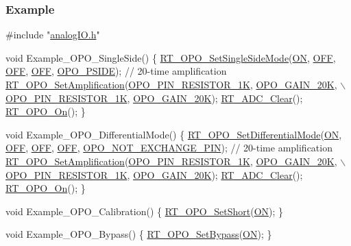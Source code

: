 \subsubsection*{Example}


\begin{DoxyCode}
\textcolor{preprocessor}{#include "\mbox{\hyperlink{a00005}{analogIO.h}}"}

\textcolor{keywordtype}{void} Example\_OPO\_SingleSide()
\{
    \mbox{\hyperlink{a00005_a6438defc0d6280f2b5baedc039f2e314}{RT\_OPO\_SetSingleSideMode}}(\mbox{\hyperlink{a00068_ad76d1750a6cdeebd506bfcd6752554d2}{ON}}, \mbox{\hyperlink{a00068_a29e413f6725b2ba32d165ffaa35b01e5}{OFF}}, \mbox{\hyperlink{a00068_a29e413f6725b2ba32d165ffaa35b01e5}{OFF}}, \mbox{\hyperlink{a00068_a29e413f6725b2ba32d165ffaa35b01e5}{OFF}}, 
      \mbox{\hyperlink{a00005_a8bcbcccda02f456b9d5395756791c1a4}{OPO\_PSIDE}});
    \textcolor{comment}{// 20-time amplification}
    \mbox{\hyperlink{a00005_ab2a6c21c91c7f05f3de9fefbd30ff95b}{RT\_OPO\_SetAmplification}}(\mbox{\hyperlink{a00005_a3e3450fbf20861f9c18264c410a6436d}{OPO\_PIN\_RESISTOR\_1K}}, 
      \mbox{\hyperlink{a00005_a359161bc139a807e18272ed299751933}{OPO\_GAIN\_20K}}, \(\backslash\)
                            \mbox{\hyperlink{a00005_a3e3450fbf20861f9c18264c410a6436d}{OPO\_PIN\_RESISTOR\_1K}}, \mbox{\hyperlink{a00005_a359161bc139a807e18272ed299751933}{OPO\_GAIN\_20K}});
    \mbox{\hyperlink{a00005_a00318bd4fc3ce7ad4f03124b91891f4f}{RT\_ADC\_Clear}}();
    \mbox{\hyperlink{a00005_a6ce23f7d735a1eedc00c509721b79446}{RT\_OPO\_On}}();
\}

\textcolor{keywordtype}{void} Example\_OPO\_DifferentialMode()
\{
    \mbox{\hyperlink{a00005_aadbc9c89735814445f0dc8d4b4eb3e54}{RT\_OPO\_SetDifferentialMode}}(\mbox{\hyperlink{a00068_ad76d1750a6cdeebd506bfcd6752554d2}{ON}}, \mbox{\hyperlink{a00068_a29e413f6725b2ba32d165ffaa35b01e5}{OFF}}, \mbox{\hyperlink{a00068_a29e413f6725b2ba32d165ffaa35b01e5}{OFF}}, 
      \mbox{\hyperlink{a00068_a29e413f6725b2ba32d165ffaa35b01e5}{OFF}}, \mbox{\hyperlink{a00005_a60931ceb0df42cf485a8e2244c50a8d5}{OPO\_NOT\_EXCHANGE\_PIN}});
    \textcolor{comment}{// 20-time amplification}
    \mbox{\hyperlink{a00005_ab2a6c21c91c7f05f3de9fefbd30ff95b}{RT\_OPO\_SetAmplification}}(\mbox{\hyperlink{a00005_a3e3450fbf20861f9c18264c410a6436d}{OPO\_PIN\_RESISTOR\_1K}}, 
      \mbox{\hyperlink{a00005_a359161bc139a807e18272ed299751933}{OPO\_GAIN\_20K}}, \(\backslash\)
                            \mbox{\hyperlink{a00005_a3e3450fbf20861f9c18264c410a6436d}{OPO\_PIN\_RESISTOR\_1K}}, \mbox{\hyperlink{a00005_a359161bc139a807e18272ed299751933}{OPO\_GAIN\_20K}});
    \mbox{\hyperlink{a00005_a00318bd4fc3ce7ad4f03124b91891f4f}{RT\_ADC\_Clear}}();
    \mbox{\hyperlink{a00005_a6ce23f7d735a1eedc00c509721b79446}{RT\_OPO\_On}}();
\}

\textcolor{keywordtype}{void} Example\_OPO\_Calibration()
\{
    \mbox{\hyperlink{a00005_aef61e41bd9fb19c3690ff5a25fb9893d}{RT\_OPO\_SetShort}}(\mbox{\hyperlink{a00068_ad76d1750a6cdeebd506bfcd6752554d2}{ON}});
\}

\textcolor{keywordtype}{void} Example\_OPO\_Bypass()
\{
    \mbox{\hyperlink{a00005_a3297280ab870eae12b918351e111819a}{RT\_OPO\_SetBypass}}(\mbox{\hyperlink{a00068_ad76d1750a6cdeebd506bfcd6752554d2}{ON}});
\}
\end{DoxyCode}
 